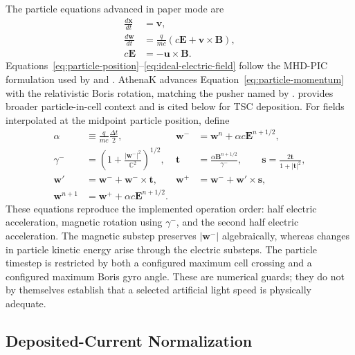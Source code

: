 \documentclass[twocolumn]{aastex701}
\begin{document}
The particle equations advanced in paper mode are
\begin{align}
\frac{d\boldsymbol{x}}{dt} &= \boldsymbol{v},
\label{eq:particle-position}\\
\frac{d\boldsymbol{w}}{dt} &=
\frac{q}{mc}\left(c\boldsymbol{E}+\boldsymbol{v}\times\boldsymbol{B}\right),
\label{eq:particle-momentum}\\
c\boldsymbol{E} &= -\boldsymbol{u}\times\boldsymbol{B}.
\label{eq:ideal-electric-field}
\end{align}
Equations~\ref{eq:particle-position}--\ref{eq:ideal-electric-field} follow the
MHD-PIC formulation used by \citet{BaiEtAl2015} and \citet{SunBai2023}.
AthenaK advances Equation~\ref{eq:particle-momentum} with the relativistic
Boris rotation, matching the pusher named by \citet{SunBai2023}.
\citet{BirdsallLangdon2018} provides broader particle-in-cell context and is
cited below for TSC deposition. For fields interpolated at the midpoint
particle position, define
\begin{align}
\alpha &\equiv \frac{q}{mc}\frac{\Delta t}{2}, &
\boldsymbol{w}^{-} &=
\boldsymbol{w}^{n}+\alpha c\boldsymbol{E}^{n+1/2},
\label{eq:boris-electric-minus}\\
\gamma^{-} &=
\left(1+\frac{|\boldsymbol{w}^{-}|^2}{\mathbb{C}^2}\right)^{1/2}, &
\boldsymbol{t} &= \frac{\alpha\boldsymbol{B}^{n+1/2}}{\gamma^{-}},
\qquad
\boldsymbol{s}=\frac{2\boldsymbol{t}}{1+|\boldsymbol{t}|^2},
\label{eq:boris-rotation-vectors}\\
\boldsymbol{w}' &= \boldsymbol{w}^{-}
+ \boldsymbol{w}^{-}\times\boldsymbol{t}, &
\boldsymbol{w}^{+} &= \boldsymbol{w}^{-}
+ \boldsymbol{w}'\times\boldsymbol{s},
\label{eq:boris-rotation}\\
\boldsymbol{w}^{n+1} &= \boldsymbol{w}^{+}
+\alpha c\boldsymbol{E}^{n+1/2}.
\label{eq:boris-electric-plus}
\end{align}
These equations reproduce the implemented operation order: half electric
acceleration, magnetic rotation using $\gamma^{-}$, and the second half
electric acceleration. The magnetic substep preserves
$|\boldsymbol{w}^{-}|$ algebraically, whereas changes in particle kinetic
energy arise through the electric substeps. The particle timestep is restricted
by both a configured maximum cell crossing and a configured maximum Boris gyro
angle. These are numerical guards; they do not by themselves establish that a
selected artificial light speed is physically adequate.

\subsection{Deposited-Current Normalization}
\end{document}
